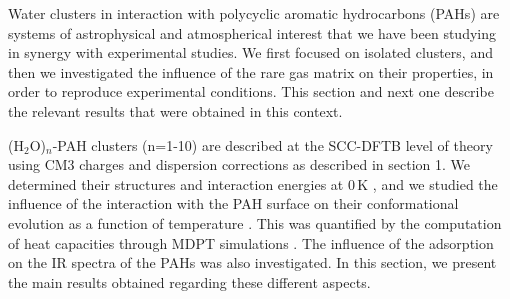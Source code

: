 \documentclass[]{interact}
\theoremstyle{plain}%
\theoremstyle{definition}
\theoremstyle{remark}
\begin{document}
Water clusters in interaction with polycyclic aromatic hydrocarbons (PAHs) are systems of astrophysical and atmospherical interest \cite{Guennoun2011,Guennoun2011bis,Noble2017} that we have been studying in synergy with experimental studies\cite{WaterCorMat_PCCP17}. We first focused on isolated clusters, and then we investigated the influence of the rare gas matrix on their properties, in order to reproduce experimental conditions. This section and next one describe the relevant results that were obtained in this context.



	 (H$_2$O)$_n$-PAH clusters (n=1-10)  are described at the SCC-DFTB level of theory using CM3 charges and dispersion corrections as described in section 1. We determined their structures and interaction energies  at 0\,K \cite{SimonPCCP2012,SimonCOMP2013,SimonJCP2013}, and we studied the influence of the interaction with the PAH surface  on their conformational evolution as a function of temperature \cite{SimonCOMP2013,SimonJCP2013}. This was quantified by the computation of heat capacities through MDPT simulations \cite{Oliveira2015}. The influence of the adsorption on the IR spectra of the PAHs was also investigated. In this section, we present the main results obtained regarding these different aspects.
	 
\end{document}
